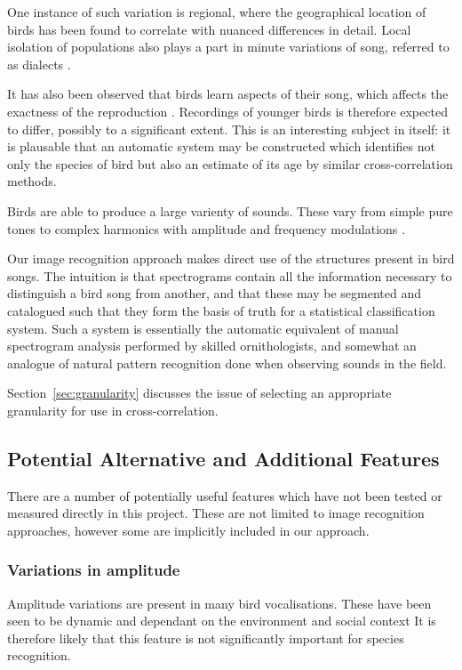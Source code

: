 One instance of such variation is regional, where the geographical
location of birds has been found to correlate with nuanced differences in detail.
Local isolation of populations also plays a part in minute variations of song,
referred to as dialects \parencite{podos2007}.

It has also been observed that birds learn aspects of their song, which affects
the exactness of the reproduction \parencite{Krood1983}.
Recordings of younger birds is therefore expected to differ, possibly to a
significant extent.
This is an interesting subject in itself: it is plausable that an automatic
system may be constructed which identifies not only the species of bird but also
an estimate of its age by similar cross-correlation methods.

Birds are able to produce a large varienty of sounds.
These vary from simple pure tones to complex harmonics with amplitude and
frequency modulations \parencite{fager2004}.

Our image recognition approach makes direct use of the structures present
in bird songs.
The intuition is that spectrograms contain all the information necessary to
distinguish a bird song from another, and that these may be segmented and
catalogued such that they form the basis of truth for a statistical
classification system.
Such a system is essentially the automatic equivalent of manual spectrogram 
analysis performed by skilled ornithologists, and somewhat an analogue of natural
pattern recognition done when observing sounds in the field.

Section~\ref{sec:granularity} discusses the issue of selecting an appropriate
granularity for use in cross-correlation.

\subsection{Potential Alternative and Additional Features}
There are a number of potentially useful features which have not been tested or
measured directly in this project.
These are not limited to image recognition approaches, however some are
implicitly included in our approach.

\subsubsection{Variations in amplitude}
Amplitude variations are present in many bird vocalisations.
These have been seen to be dynamic and dependant on the environment and social
context \parencite{brumm2004}
It is therefore likely that this feature is not significantly important for
species recognition.

